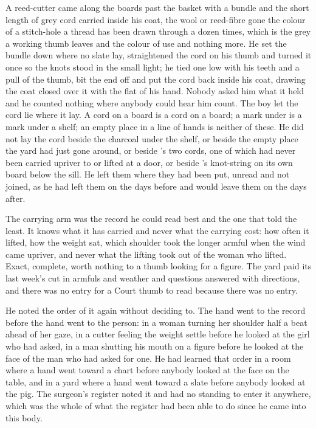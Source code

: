 A reed-cutter came along the boards past the basket with a bundle and the short length of grey cord carried inside his coat, the wool or reed-fibre gone the colour of a stitch-hole a thread has been drawn through a dozen times, which is the grey a working thumb leaves and the colour of use and nothing more. He set the bundle down where no slate lay, straightened the cord on his thumb and turned it once so the knots stood in the small light; he tied one low with his teeth and a pull of the thumb, bit the end off and put the cord back inside his coat, drawing the coat closed over it with the flat of his hand. Nobody asked him what it held and he counted nothing where anybody could hear him count. The boy let the cord lie where it lay. A cord on a board is a cord on a board; a mark under  is a mark under a shelf; an empty place in a line of hands is neither of these. He did not lay the cord beside the charcoal under the shelf, or beside the empty place the yard had just gone around, or beside 's two cords, one of which had never been carried upriver to  or lifted at a door, or beside 's knot-string on its own board below the sill. He left them where they had been put, unread and not joined, as he had left them on the days before and would leave them on the days after.

The carrying arm was the record he could read best and the one that told the least. It knows what it has carried and never what the carrying cost: how often it lifted, how the weight sat, which shoulder took the longer armful when the wind came upriver, and never what the lifting took out of the woman who lifted. Exact, complete, worth nothing to a thumb looking for a figure. The yard paid its last week's cut in armfuls and weather and questions answered with directions, and there was no entry for a Court thumb to read because there was no entry.

He noted the order of it again without deciding to. The hand went to the record before the hand went to the person: in a woman turning her shoulder half a beat ahead of her gaze, in a cutter feeling the weight settle before he looked at the girl who had asked, in a man shutting his mouth on a figure before he looked at the face of the man who had asked for one. He had learned that order in a room where a hand went toward a chart before anybody looked at the face on the table, and in a yard where a hand went toward a slate before anybody looked at the pig. The surgeon's register noted it and had no standing to enter it anywhere, which was the whole of what the register had been able to do since he came into this body.

